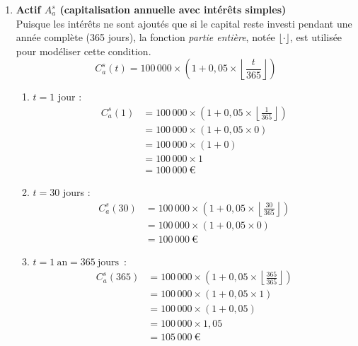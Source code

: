 \documentclass{article}
\begin{document}
\begin{enumerate}[label=\textbf{R1.\arabic*}]
    \item \textbf{Actif \( A_a^s \) (capitalisation annuelle avec intérêts simples)} \\
    Puisque les intérêts ne sont ajoutés que si le capital reste investi pendant une année complète (365 jours), la fonction \emph{partie entière}, notée $\lfloor \cdot \rfloor$, est utilisée pour modéliser cette condition.
    \[
    C_a^s(t) = 100\,000 \times \left(1 + 0,05 \times \left\lfloor \frac{t}{365} \right\rfloor \right)
    \]
    \begin{enumerate}[label=(\alph*)]
        \item \( t = 1 \) jour : 
        \begin{align*}
        C_a^s(1) &= 100\,000 \times \left(1 + 0,05 \times \left\lfloor \frac{1}{365} \right\rfloor \right) \\
                 &= 100\,000 \times \left(1 + 0,05 \times 0 \right) \\
                 &= 100\,000 \times (1 + 0) \\
                 &= 100\,000 \times 1 \\
                 &= \boxed{100\,000\ \text{€}}
        \end{align*}
        
        \item \( t = 30 \) jours : 
        \begin{align*}
        C_a^s(30) &= 100\,000 \times \left(1 + 0,05 \times \left\lfloor \frac{30}{365} \right\rfloor \right) \\
                 &= 100\,000 \times \left(1 + 0,05 \times 0 \right) \\
                 &= \boxed{100\,000\ \text{€}}
        \end{align*}
        
        \item $t = 1\ \text{an} = 365\ \text{jours}$~: 
        \begin{align*}
        C_a^s(365) &= 100\,000 \times \left(1 + 0,05 \times \left\lfloor \frac{365}{365} \right\rfloor \right) \\
                 &= 100\,000 \times \left(1 + 0,05 \times 1 \right) \\
                 &= 100\,000 \times \left(1 + 0,05 \right) \\
                 &= 100\,000 \times 1,05 \\
                 &= \boxed{105\,000\ \text{€}}
        \end{align*}
        

\end{enumerate}
\end{enumerate}
\end{document}
